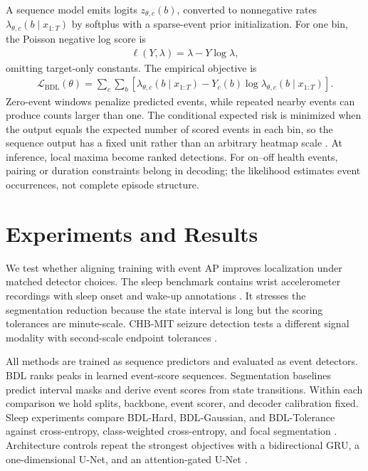 \documentclass{article}
\newcommand{\xseq}{x_{1:T}}
\newcommand{\rate}{\lambda}
\begin{document}
A sequence model emits logits $z_{\theta,c}(b)$, converted to nonnegative
rates $\rate_{\theta,c}(b\mid\xseq)$ by softplus with a sparse-event prior
initialization.
For one bin, the Poisson negative log score is
\begin{align}
  \ell(Y,\rate)=\rate - Y\log \rate,
\end{align}
omitting target-only constants.
The empirical objective is
\begin{align}
  \mathcal{L}_{\mathrm{BDL}}(\theta)
  =
  \sum_c\sum_b
  \left[\rate_{\theta,c}(b\mid\xseq)
  -Y_c(b)\log \rate_{\theta,c}(b\mid\xseq)\right].
  \label{eq:loss}
\end{align}
Zero-event windows penalize predicted events, while repeated nearby events can
produce counts larger than one.
The conditional expected risk is minimized when the output equals the expected
number of scored events in each bin, so the sequence output has a fixed unit
rather than an arbitrary heatmap scale \citep{gneiting2007proper}.
At inference, local maxima become ranked detections.
For on--off health events, pairing or duration constraints belong in decoding;
the likelihood estimates event occurrences, not complete episode structure.

\section{Experiments and Results}

We test whether aligning training with event AP improves localization under
matched detector choices.
The sleep benchmark contains wrist accelerometer recordings with sleep onset
and wake-up annotations \citep{alexander2017,migueles2019,robbins2019,esper2023}.
It stresses the segmentation reduction because the state interval is long but
the scoring tolerances are minute-scale.
CHB-MIT seizure detection tests a different signal modality with second-scale
endpoint tolerances \citep{shoeb2010,goldberger2000,klem1999}.

All methods are trained as sequence predictors and evaluated as event
detectors.
BDL ranks peaks in learned event-score sequences.
Segmentation baselines predict interval masks and derive event scores from
state transitions.
Within each comparison we hold splits, backbone, event scorer, and decoder
calibration fixed.
Sleep experiments compare BDL-Hard, BDL-Gaussian, and BDL-Tolerance against
cross-entropy, class-weighted cross-entropy, and focal segmentation
\citep{krawczyk2016,lin2017focal}.
Architecture controls repeat the strongest objectives with a bidirectional
GRU, a one-dimensional U-Net, and an attention-gated U-Net
\citep{ronneberger2015,oktay2018attention}.
\end{document}
